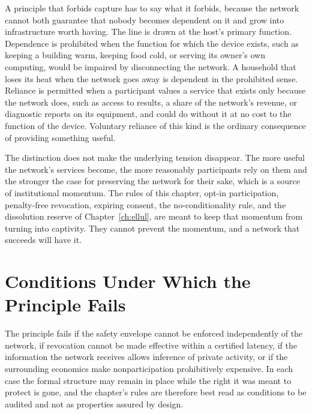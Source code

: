 A principle that forbids capture has to say what it forbids, because the network cannot both guarantee that nobody becomes dependent on it and grow into infrastructure worth having. The line is drawn at the host's primary function. Dependence is prohibited when the function for which the device exists, such as keeping a building warm, keeping food cold, or serving its owner's own computing, would be impaired by disconnecting the network. A household that loses its heat when the network goes away is dependent in the prohibited sense. Reliance is permitted when a participant values a service that exists only because the network does, such as access to results, a share of the network's revenue, or diagnostic reports on its equipment, and could do without it at no cost to the function of the device. Voluntary reliance of this kind is the ordinary consequence of providing something useful.

The distinction does not make the underlying tension disappear. The more useful the network's services become, the more reasonably participants rely on them and the stronger the case for preserving the network for their sake, which is a source of institutional momentum. The rules of this chapter, opt-in participation, penalty-free revocation, expiring consent, the no-conditionality rule, and the dissolution reserve of Chapter~\ref{ch:ellul}, are meant to keep that momentum from turning into captivity. They cannot prevent the momentum, and a network that succeeds will have it.

\section{Conditions Under Which the Principle Fails}

The principle fails if the safety envelope cannot be enforced independently of the network, if revocation cannot be made effective within a certified latency, if the information the network receives allows inference of private activity, or if the surrounding economics make nonparticipation prohibitively expensive. In each case the formal structure may remain in place while the right it was meant to protect is gone, and the chapter's rules are therefore best read as conditions to be audited and not as properties assured by design.
